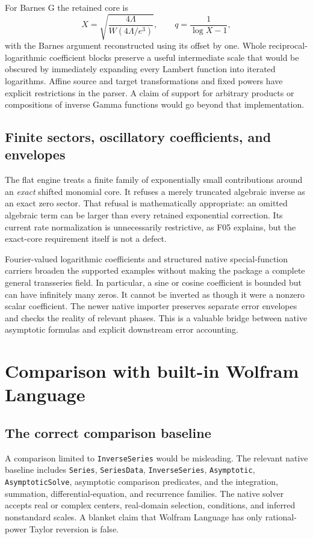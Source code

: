 For Barnes G the retained core is
\[
 X=\sqrt{\frac{4\Lambda}{W(4\Lambda/e^3)}},
 \qquad q=\frac1{\log X-1},
\]
with the Barnes argument reconstructed using its offset by one. Whole reciprocal-logarithmic coefficient blocks preserve a useful intermediate scale that would be obscured by immediately expanding every Lambert function into iterated logarithms. Affine source and target transformations and fixed powers have explicit restrictions in the parser. A claim of support for arbitrary products or compositions of inverse Gamma functions would go beyond that implementation.\cite{gammainverse,guide}

\subsection{Finite sectors, oscillatory coefficients, and envelopes}

The flat engine treats a finite family of exponentially small contributions around an \emph{exact} shifted monomial core. It refuses a merely truncated algebraic inverse as an exact zero sector. That refusal is mathematically appropriate: an omitted algebraic term can be larger than every retained exponential correction. Its current rate normalization is unnecessarily restrictive, as F05 explains, but the exact-core requirement itself is not a defect.\cite{flat}

Fourier-valued logarithmic coefficients and structured native special-function carriers broaden the supported examples without making the package a complete general transseries field. In particular, a sine or cosine coefficient is bounded but can have infinitely many zeros. It cannot be inverted as though it were a nonzero scalar coefficient. The newer native importer preserves separate error envelopes and checks the reality of relevant phases. This is a valuable bridge between native asymptotic formulas and explicit downstream error accounting.\cite{guide,native}

\section{Comparison with built-in Wolfram Language}
\label{sec:comparison}

\subsection{The correct comparison baseline}

A comparison limited to \texttt{InverseSeries} would be misleading. The relevant native baseline includes \texttt{Series}, \texttt{SeriesData}, \texttt{InverseSeries}, \texttt{Asymptotic}, \texttt{AsymptoticSolve}, asymptotic comparison predicates, and the integration, summation, differential-equation, and recurrence families. The native solver accepts real or complex centers, real-domain selection, conditions, and inferred nonstandard scales. A blanket claim that Wolfram Language has only rational-power Taylor reversion is false.\cite{wl-series,wl-seriesdata,wl-inverseseries,wl-asymptotic,wl-asymptoticsolve}


